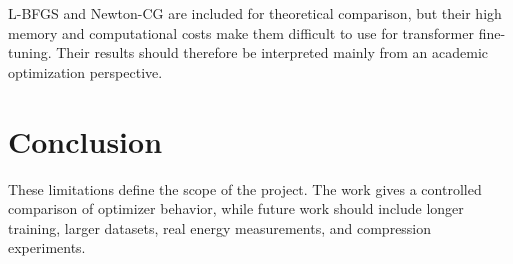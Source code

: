 L-BFGS and Newton-CG are included for theoretical comparison, but their high
memory and computational costs make them difficult to use for transformer
fine-tuning. Their results should therefore be interpreted mainly from an
academic optimization perspective.

\section{Conclusion}

These limitations define the scope of the project. The work gives a controlled
comparison of optimizer behavior, while future work should include longer
training, larger datasets, real energy measurements, and compression experiments.
